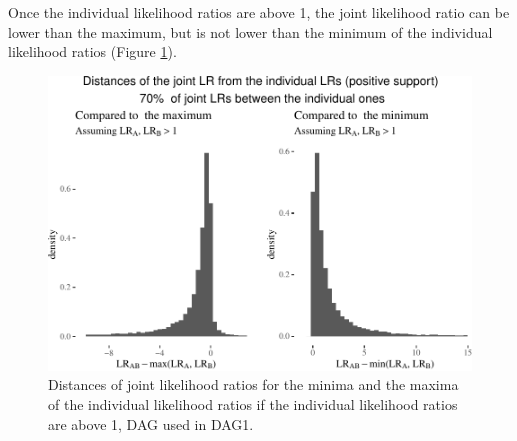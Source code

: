 \documentclass[
  10pt,
  dvipsnames,enabledeprecatedfontcommands]{scrartcl}
\begin{document}
Once the individual likelihood ratios are above 1, the joint likelihood
ratio can be lower than the maximum, but is not lower than the minimum
of the individual likelihood ratios (Figure \ref{fig:LRabovePlot}).

\begin{figure}


\begin{center}\includegraphics[width=1\linewidth]{conjunction-appendix5_files/figure-latex/unnamed-chunk-13-1} \end{center}

\caption{Distances of joint likelihood ratios for the minima and the maxima of the individual likelihood ratios if the individual likelihood ratios are above 1, DAG used in \textsf{DAG1}.}
\label{fig:LRabovePlot}
\end{figure}
\end{document}
